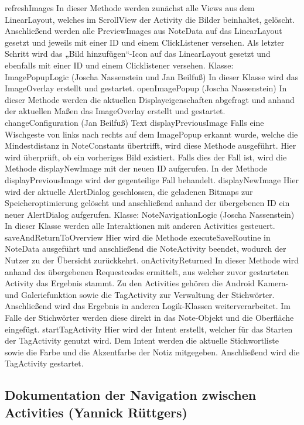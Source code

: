 refreshImages
In dieser Methode werden zunächst alle Views aus dem LinearLayout, welches im ScrollView der Activity die Bilder beinhaltet, gelöscht. Anschließend werden alle PreviewImages aus NoteData auf das LinearLayout gesetzt und jeweils mit einer ID und einem ClickListener versehen. Als letzter Schritt wird das „Bild hinzufügen“-Icon auf das LinearLayout gesetzt und ebenfalls mit einer ID und einem Clicklistener versehen.
Klasse: ImagePopupLogic (Joscha Nassenstein und Jan Beilfuß)
In dieser Klasse wird das ImageOverlay erstellt und gestartet.
openImagePopup (Joscha Nassenstein)
In dieser Methode werden die aktuellen Displayeigenschaften abgefragt und anhand der aktuellen Maßen das ImageOverlay erstellt und gestartet.
changeConfiguration (Jan Beilfuß)
Text
displayPreviousImage
Falls eine Wischgeste von links nach rechts auf dem ImagePopup erkannt wurde, welche die Mindestdistanz in NoteConstants übertrifft, wird diese Methode ausgeführt. Hier wird überprüft, ob ein vorheriges Bild existiert. Falls dies der Fall ist, wird die Methode displayNewImage mit der neuen ID aufgerufen. In der Methode displayPreviousImage wird der gegenteilige Fall behandelt.
displayNewImage
Hier wird der aktuelle AlertDialog geschlossen, die geladenen Bitmaps zur Speicheroptimierung gelöscht und anschließend anhand der übergebenen ID ein neuer AlertDialog aufgerufen.
Klasse: NoteNavigationLogic (Joscha Nassenstein)
In dieser Klasse werden alle Interaktionen mit anderen Activities gesteuert.
saveAndReturnToOverview
Hier wird die Methode executeSaveRoutine in NoteData ausgeführt und anschließend die NoteActivity beendet, wodurch der Nutzer zu der Übersicht zurückkehrt.
onActivityReturned
In dieser Methode wird anhand des übergebenen Requestcodes ermittelt, aus welcher zuvor gestarteten Activity das Ergebnis stammt. Zu den Activities gehören die Android Kamera- und Galeriefunktion sowie die TagActivity zur Verwaltung der Stichwörter. Anschließend wird das Ergebnis in anderen Logik-Klassen weiterverarbeitet. Im Falle der Stichwörter werden diese direkt in das Note-Objekt und die Oberfläche eingefügt.
startTagActivity
Hier wird der Intent erstellt, welcher für das Starten der TagActivity genutzt wird. Dem Intent werden die aktuelle Stichwortliste sowie die Farbe und die Akzentfarbe der Notiz mitgegeben. Anschließend wird die TagActivity gestartet.

\newpage
\fancyhead[L]{}
\subsection{Dokumentation der Navigation zwischen Activities (Yannick Rüttgers)}

